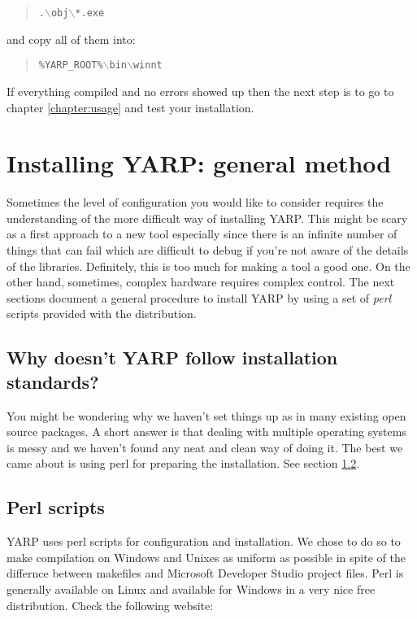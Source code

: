 \begin{quote}
{\tt .$\backslash$obj$\backslash$*.exe}
\end{quote}

\noindent and copy all of them into:

\begin{quote}
{\tt \%YARP\_ROOT\%$\backslash$bin$\backslash$winnt}
\end{quote}

If everything compiled and no errors showed up then the next step is to go to chapter \ref{chapter:usage} and test your installation. 


\section{Installing YARP: general method}
Sometimes the level of configuration you would like to consider requires the understanding of the more difficult way of installing YARP. This might be scary as a first approach to a new tool especially since there is an infinite number of things that can fail which are difficult to debug if you're not aware of the details of the libraries. Definitely, this is too much for making a tool a good one. On the other hand, sometimes, complex hardware requires complex control. The next sections document a general procedure to install YARP by using a set of {\em perl} scripts provided with the distribution.

\subsection{Why doesn't YARP follow installation standards?}
You might be wondering why we haven't set things up as in many existing open source packages. A short answer is that dealing with multiple operating systems is messy and we haven't found any neat and clean way of doing it. The best we came about is using perl for preparing the installation. See section \ref{sect:perl}.

\subsection{Perl scripts}
\label{sect:perl}

YARP uses perl scripts for configuration and installation. We chose to do so to make compilation on Windows and Unixes as uniform as possible in spite of the differnce between makefiles and Microsoft Developer Studio project files. Perl is generally available on Linux and available for Windows in a very nice free distribution. Check the following website:

